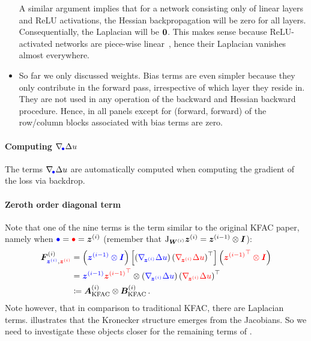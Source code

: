 \begin{itemize}
  A similar argument implies that for a network consisting only of linear layers and ReLU activations, the Hessian backpropagation will be zero for all layers.
  Consequentially, the Laplacian will be ${\bm{0}}$.
  This makes sense because ReLU-activated networks are piece-wise linear~\cite{arora2018understanding}, hence their Laplacian vanishes almost everywhere.

\item So far we only discussed weights.
  Bias terms are even simpler because they only contribute in the forward pass, irrespective of which layer they reside in.
  They are not used in any operation of the backward and Hessian backward procedure.
  Hence, in all panels except for (forward, forward) of  the row/column blocks associated with bias terms are zero.
\end{itemize}

\paragraph{Computing $\nabla_{\!{\textcolor{blue}{\bullet}}}\Delta u$}
The terms $\nabla_{\!{\textcolor{blue}{\bullet}}}\Delta u$ are automatically computed when computing the gradient of the loss via backdrop.

\paragraph{Zeroth order diagonal term}
Note that one of the nine terms is the term similar to the original KFAC paper, namely
when $\textcolor{blue}{\bullet} = \textcolor{red}{\bullet} = {\bm{z}}^{(i)}$
(remember that $\mathrm{J}_{{\bm{W}}^{(i)}} {\bm{z}}^{(i)} = {\bm{z}}^{(i-1)} \otimes {\bm{I}}$):
\begin{align}\label{eq:original-kfac}
  \begin{split}
    {\bm{F}}^{(i)}_{\textcolor{blue}{{\bm{z}}^{(i)}}, \textcolor{red}{{\bm{z}}^{(i)}}}
    &=
      \left(
      \textcolor{blue}{{\bm{z}}^{(i-1)} \otimes {\bm{I}}}
      \right)
      \left[
      \left(
      \textcolor{blue}{\nabla_{\!{{\bm{z}}^{(i)}}}\Delta u}
      \right)
      \left(
      \textcolor{red}{\nabla_{\!{{\bm{z}}^{(i)}}}\Delta u}
      \right)^{\top}
      \right]
      \left(
      \textcolor{red}{{{\bm{z}}^{(i-1)}}^{\top} \otimes {\bm{I}}}
      \right)
    \\
    &=
      \textcolor{blue}{{\bm{z}}^{(i-1)}}
      \textcolor{red}{{{\bm{z}}^{(i-1)}}^{\top}}
      \otimes
      \left(
      \textcolor{blue}{\nabla_{\!{{\bm{z}}^{(i)}}}\Delta u}
      \right)
      \left(
      \textcolor{red}{\nabla_{\!{{\bm{z}}^{(i)}}}\Delta u}
      \right)^{\top}
    \\
    &\coloneqq {\bm{A}}_{\text{KFAC}}^{(i)} \otimes {\bm{B}}_{\text{KFAC}}^{(i)}\,.
  \end{split}
\end{align}
Note however, that in comparison to traditional KFAC, there are Laplacian terms.
 illustrates that the Kronecker structure emerges from
the Jacobians. So we need to investigate these objects closer for the remaining
terms of .


